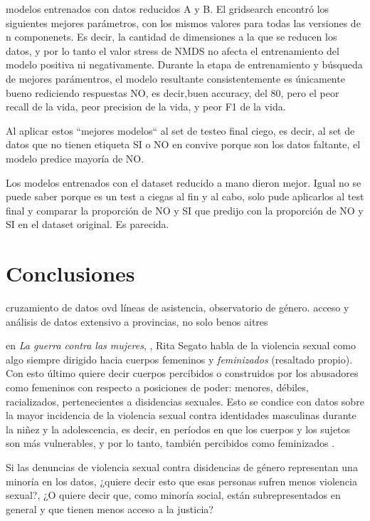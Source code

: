 \documentclass[10 pt]{article}
\begin{document}
modelos entrenados con datos reducidos A y B. El gridsearch encontró los siguientes mejores parámetros, con los mismos valores para todas las versiones de n componenets. Es decir, la cantidad de dimensiones a la que se reducen los datos, y por lo tanto el valor stress de NMDS no afecta el entrenamiento del modelo positiva ni negativamente. Durante la etapa de entrenamiento y búsqueda de mejores parámentros, el modelo resultante consistentemente es únicamente bueno rediciendo respuestas NO, es decir,buen accuracy, del 80, pero el peor recall de la vida, peor precision de la vida, y peor F1 de la vida.

Al aplicar estos “mejores modelos“ al set de testeo final ciego, es decir, al set de datos que no tienen etiqueta SI o NO en convive porque son los datos faltante, el modelo predice mayoría de NO.


Los modelos entrenados con el dataset reducido a mano dieron mejor. Igual no se puede saber porque es un test a ciegas al fin y al cabo, solo pude aplicarlos al test final y comparar la proporción de NO y SI que predijo con la proporción de NO y SI en el dataset original. Es parecida.

\section{Conclusiones}\label{conc}
cruzamiento de datos ovd líneas de asistencia, observatorio de género.
acceso y análisis de datos extensivo a provincias, no solo benos aitres



en \textit{La guerra contra las mujeres}, \citeyearpar{segato2016guerra}, Rita Segato habla de la violencia sexual como algo siempre dirigido hacia cuerpos femeninos y \textit{feminizados} (resaltado propio). Con esto último quiere decir cuerpos percibidos o construidos por los abusadores como femeninos con respecto a posiciones de poder: menores, débiles, racializados, pertenecientes a disidencias sexuales. Esto se condice con datos sobre la mayor incidencia de la violencia sexual contra identidades masculinas durante la niñez y la adolescencia, es decir, en períodos en que los cuerpos y los sujetos son más vulnerables, y por lo tanto, también percibidos como feminizados \citep*{contreras2016violencia,ufem_relevamiento,ferris2002world}.

Si las denuncias de violencia sexual contra disidencias de género representan una minoría en los datos, ¿quiere decir esto que esas personas sufren menos violencia sexual?, ¿O quiere decir que, como minoría social, están subrepresentados en general y que tienen menos acceso a la justicia?
\end{document}
